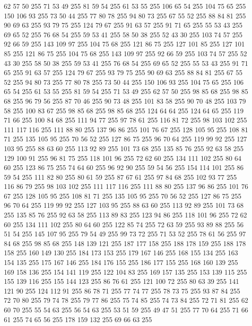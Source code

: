 62 57 50 255 71 53 49 255 81 59 54 255 61 53 55 255 106 65 54 255 104 75 65 255 150 106 93 255 73 50 44 255 77 80 78 255 94 80 73 255 67 55 52 255 88 84 81 255 90 69 63 255 93 79 75 255 124 79 67 255 91 63 57 255 91 71 65 255 55 53 43 255 69 65 52 255 76 68 54 255 59 53 41 255 58 50 38 255 52 43 30 255 103 74 57 255 92 66 59 255 143 109 97 255 104 75 68 255 121 86 75 255 127 101 85 255 127 101 85 255 121 86 75 255 104 75 68 255 143 109 97 255 92 66 59 255 103 74 57 255 52 43 30 255 58 50 38 255 59 53 41 255 76 68 54 255 69 65 52 255 55 53 43 255 91 71 65 255 91 63 57 255 124 79 67 255 93 79 75 255 90 69 63 255 88 84 81 255 67 55 52 255 94 80 73 255 77 80 78 255 73 50 44 255 150 106 93 255 104 75 65 255 106 65 54 255 61 53 55 255 81 59 54 255 71 53 49 255 62 57 50 255 98 85 68 255 98 85 68 255 96 79 56 255 87 70 46 255 90 73 48 255 101 83 58 255
90 70 48 255 103 79 58 255 100 83 67 255 98 85 68 255 98 85 68 255 124 64 64 255 124 64 65 255 119 71 66 255 100 84 68 255 111 94 77 255 97 78 61 255 116 81 72 255 98 103 102 255 111 117 116 255 111 88 80 255 137 96 86 255 101 76 67 255 128 105 95 255 108 81 71 255 135 105 95 255 70 56 52 255 127 86 75 255 96 70 64 255 119 99 92 255 127 103 95 255 88 63 60 255 113 92 89 255 101 73 68 255 135 85 76 255 92 63 58 255 129 100 91 255 96 81 75 255 118 101 96 255 72 62 60 255 134 111 102 255 80 64 60 255 123 86 75 255 74 64 60 255 96 92 90 255 59 54 56 255 154 114 101 255 86 59 54 255 111 82 80 255 80 61 59 255 87 67 61 255 97 84 68 255 102 93 77 255 116 86 79 255 98 103 102 255 111 117 116 255 111 88 80 255 137 96 86 255 101 76 67 255 128 105 95 255 108 81 71 255 135 105 95 255 70 56 52 255 127 86 75 255 96 70 64 255 119 99 92 255 127 103 95 255 88 63 60 255 113 92 89 255 101 73 68 255
135 85 76 255 92 63 58 255 113 89 83 255 123 94 86 255 118 101 96 255 72 62 60 255 134 111 102 255 80 64 60 255 122 85 74 255 72 63 59 255 93 89 88 255 56 51 54 255 145 107 95 255 79 54 49 255 99 73 72 255 71 53 52 255 78 61 56 255 97 84 68 255 98 85 68 255 148 139 121 255 187 177 158 255 188 178 159 255 188 178 158 255 160 149 130 255 184 173 153 255 179 167 146 255 168 155 134 255 163 154 135 255 175 167 146 255 184 176 155 255 186 177 155 255 168 160 139 255 169 158 136 255 154 141 119 255 122 104 83 255 169 157 135 255 153 139 115 255 155 139 116 255 155 144 123 255 86 76 61 255 121 100 72 255 80 63 39 255 141 121 90 255 124 112 91 255 86 78 71 255 77 74 77 255 78 73 75 255 93 87 84 255 72 70 80 255 79 74 78 255 79 77 86 255 75 74 85 255 74 73 84 255 72 71 81 255 62 60 70 255 55 54 63 255 56 54 63 255 53 51 59 255 49 47 51 255 77 70 64 255 71 66 61 255 74 65 56 255 178 159 132 255 69 66 63 255
